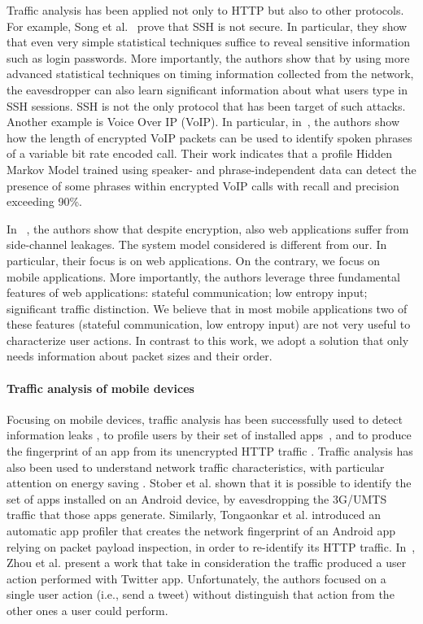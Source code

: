 \documentclass{acm_proc_article-sp}
\newcommand{\hilight}[1]{#1}
\begin{document}
Traffic analysis has been applied not only to HTTP but also to other protocols. 
For example, Song et al.~\cite{Song:2001:TAK:1251327.1251352} prove that SSH is not secure. In particular, they show that 
 even very simple statistical techniques suffice to reveal sensitive 
information such as login passwords. More importantly, the authors show that by using 
more advanced statistical techniques on timing information collected from the 
network, the eavesdropper can also learn significant information about what users 
type in SSH sessions. 
SSH is not the only 
protocol that has been target of such attacks. 
Another example is Voice Over IP (VoIP). In particular, in~\cite{Wright:2008:SMY:1397759.1398055}, the authors 
show how the length of encrypted VoIP packets can be used to identify spoken 
phrases of a variable bit rate encoded call. Their work indicates that a profile 
Hidden Markov Model trained using speaker- and phrase-independent data can 
detect the presence of some phrases within encrypted VoIP calls with recall and 
precision exceeding 90\%.

In ~\cite{shuosp2010}, \hilight{the authors show that despite encryption, 
also web applications suffer from side-channel leakages. The system model considered is different from our. 
In particular, their focus is on web applications. On the contrary, we focus on mobile applications. 
More importantly, the authors leverage three fundamental features of web applications: stateful communication; low entropy input; 
significant traffic distinction. 
We believe that in most mobile applications two of these features (stateful communication, low entropy input) 
are not very useful to characterize user actions. In contrast to this work, we adopt a solution that only needs 
information about packet sizes and their order.
}


\paragraph{Traffic analysis of mobile devices}
Focusing on mobile devices, traffic analysis has been successfully used to detect 
information leaks \cite{Enck:2010:TIT:1924943.1924971}, 
to profile users by their set of installed apps~\cite{Stober:2013:YSY:2462096.2462099}, 
\hilight{and to produce the fingerprint of an app from its unencrypted HTTP traffic} \cite{DaiTWNS:2013}.
Traffic analysis has also been used to understand network traffic characteristics, 
with particular attention on energy saving \cite{Falaki:2010:FLT:1879141.1879176}. Stober et al. \cite{Stober:2013:YSY:2462096.2462099} shown that it is possible to identify the set of apps installed on an Android device, 
by eavesdropping the 3G/UMTS traffic that those apps generate.
Similarly, Tongaonkar et al. \cite{DaiTWNS:2013} \hilight{introduced an automatic app profiler that creates the network fingerprint
of an Android app relying on packet payload inspection, in order to re-identify its HTTP traffic.} 
In~\cite{zhouccs2013}, \hilight{Zhou et al. present a work that take in consideration the traffic produced a user action performed with Twitter app.
Unfortunately, the authors focused on a single user action (i.e., send a tweet) without distinguish that action from the other ones a user could perform.}
\end{document}
